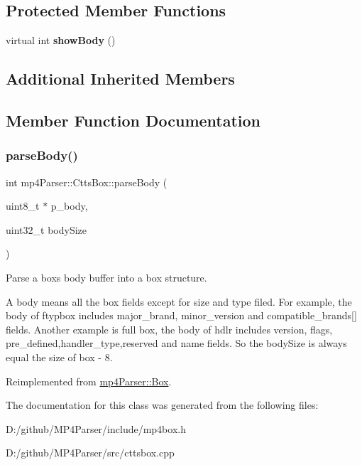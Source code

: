 \subsection*{Protected Member Functions}
\begin{DoxyCompactItemize}
\item 
\mbox{\label{classmp4_parser_1_1_ctts_box_aa1272e0b2b1adbb58ac5416cb9afcd21}} 
virtual int {\bfseries show\+Body} ()
\end{DoxyCompactItemize}
\subsection*{Additional Inherited Members}


\subsection{Member Function Documentation}
\mbox{\label{classmp4_parser_1_1_ctts_box_a5fe22fc963e1a4bf8268d314367fc691}} 
\subsubsection{\texorpdfstring{parseBody()}{parseBody()}}
{\footnotesize\ttfamily int mp4\+Parser\+::\+Ctts\+Box\+::parse\+Body (\begin{DoxyParamCaption}\item[{uint8\+\_\+t $\ast$}]{p\+\_\+body,  }\item[{uint32\+\_\+t}]{body\+Size }\end{DoxyParamCaption})\hspace{0.3cm}{\ttfamily [virtual]}}



Parse a box\textquotesingle{}s body buffer into a box structure. 

A body means all the box fields except for size and type filed. For example, the body of ftypbox includes major\+\_\+brand, minor\+\_\+version and compatible\+\_\+brands\mbox{[}\mbox{]} fields. Another example is full box, the body of hdlr includes version, flags, pre\+\_\+defined,handler\+\_\+type,reserved and name fields. So the body\+Size is always equal the size of box -\/ 8. 

Reimplemented from \mbox{\hyperlink{classmp4_parser_1_1_box_a3dd0c084ac65bc77b69ac5ecaf796cb2}{mp4\+Parser\+::\+Box}}.



The documentation for this class was generated from the following files\+:\begin{DoxyCompactItemize}
\item 
D\+:/github/\+M\+P4\+Parser/include/mp4box.\+h\item 
D\+:/github/\+M\+P4\+Parser/src/cttsbox.\+cpp\end{DoxyCompactItemize}
